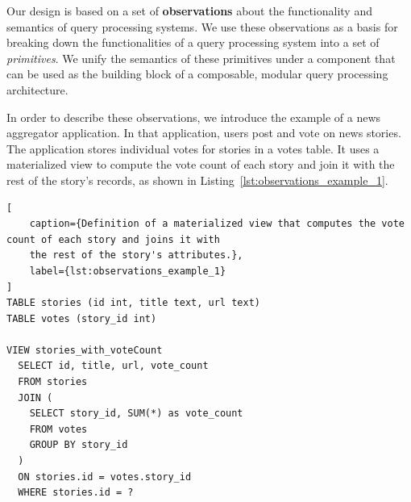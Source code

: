 




\bigskip
\noindent
Our design is based on a set of \textbf{observations} about the functionality and semantics of query processing systems.
We use these observations as a basis for breaking down the functionalities of a query processing system into a
set of \textit{primitives}.
We unify the semantics of these primitives under a component that can be used as the building block
of a composable, modular query processing architecture.

In order to describe these observations, we introduce the example of a news aggregator application.
In that application, users post and vote on news stories.
The application stores individual votes for stories in a votes table.
It uses a materialized view to compute the vote count of each story and join it with the rest of the story's records,
as shown in Listing~\ref{lst:observations_example_1}.

\begin{lstlisting}[
    caption={Definition of a materialized view that computes the vote count of each story and joins it with
    the rest of the story's attributes.},
    label={lst:observations_example_1}
]
TABLE stories (id int, title text, url text)
TABLE votes (story_id int)

VIEW stories_with_voteCount
  SELECT id, title, url, vote_count
  FROM stories
  JOIN (
    SELECT story_id, SUM(*) as vote_count
    FROM votes
    GROUP BY story_id
  )
  ON stories.id = votes.story_id
  WHERE stories.id = ?
\end{lstlisting}

